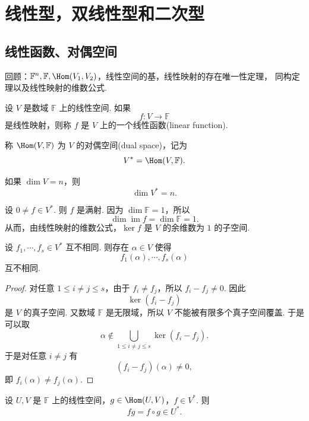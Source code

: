 \setchapterintro{}
\chapter{线性型，双线性型和二次型}


\section{线性函数、对偶空间}

回顾：$\mathbb{F}^n,\mathbb{F},\Hom(V_1,V_2)$，线性空间的基，线性映射的存在唯一性定理，
同构定理以及线性映射的维数公式.

\begin{definition}
	设 $V$ 是数域 $\mathbb{F}$ 上的线性空间. 如果
	\[
	f:V\longrightarrow \mathbb{F}
	\]
	是线性映射，则称 $f$ 是 $V$ 上的一个线性函数(linear function).
	
	称 $\Hom(V,\mathbb{F})$ 为 $V$ 的对偶空间(dual space)，记为
	\[
	V^*=\Hom(V,\mathbb{F}).
	\]
\end{definition}

\begin{example}
	如果 $\dim V=n$，则
	\[
	\dim V^*=n.
	\]
\end{example}

\begin{example}
	设 $0\ne f\in V^*$. 则 $f$ 是满射. 因为 $\dim \mathbb{F}=1$，所以
	\[
	\dim \operatorname{im} f=\dim \mathbb{F}=1.
	\]
	从而，由线性映射的维数公式，$\ker f$ 是 $V$ 的余维数为 $1$ 的子空间.
\end{example}

\begin{example}
	设 $f_1,\cdots,f_s\in V^*$ 互不相同. 则存在 $\alpha\in V$ 使得
	\[
	f_1(\alpha),\cdots,f_s(\alpha)
	\]
	互不相同.
\end{example}

\begin{proof}
	对任意 $1\leq i\ne j\leq s$，由于 $f_i\ne f_j$，所以 $f_i-f_j\ne 0$. 因此
	\[
	\ker(f_i-f_j)
	\]
	是 $V$ 的真子空间. 又数域 $\mathbb{F}$ 是无限域，所以 $V$ 不能被有限多个真子空间覆盖.
	于是可以取
	\[
	\alpha\notin \bigcup_{1\leq i\ne j\leq s}\ker(f_i-f_j).
	\]
	于是对任意 $i\ne j$ 有
	\[
	(f_i-f_j)(\alpha)\ne0,
	\]
	即 $f_i(\alpha)\ne f_j(\alpha)$.
\end{proof}

\begin{example}
	设 $U,V$ 是 $\mathbb{F}$ 上的线性空间，$g\in \Hom(U,V)$，$f\in V^*$. 则
	\[
	fg=f\circ g\in U^*.
	\]
\end{example}

